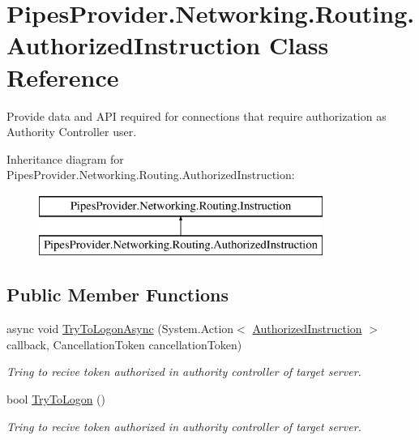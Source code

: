 \hypertarget{class_pipes_provider_1_1_networking_1_1_routing_1_1_authorized_instruction}{}\section{Pipes\+Provider.\+Networking.\+Routing.\+Authorized\+Instruction Class Reference}
\label{class_pipes_provider_1_1_networking_1_1_routing_1_1_authorized_instruction}


Provide data and A\+PI required for connections that require authorization as Authority Controller user.  


Inheritance diagram for Pipes\+Provider.\+Networking.\+Routing.\+Authorized\+Instruction\+:\begin{figure}[H]
\begin{center}
\leavevmode
\includegraphics[height=2.000000cm]{df/deb/class_pipes_provider_1_1_networking_1_1_routing_1_1_authorized_instruction}
\end{center}
\end{figure}
\subsection*{Public Member Functions}
\begin{DoxyCompactItemize}
\item 
async void \mbox{\hyperlink{class_pipes_provider_1_1_networking_1_1_routing_1_1_authorized_instruction_a20e94ddf386abb937f4c725a094dc050}{Try\+To\+Logon\+Async}} (System.\+Action$<$ \mbox{\hyperlink{class_pipes_provider_1_1_networking_1_1_routing_1_1_authorized_instruction}{Authorized\+Instruction}} $>$ callback, Cancellation\+Token cancellation\+Token)
\begin{DoxyCompactList}\small\item\em Tring to recive token authorized in authority controller of target server. \end{DoxyCompactList}\item 
bool \mbox{\hyperlink{class_pipes_provider_1_1_networking_1_1_routing_1_1_authorized_instruction_addf69c3fea172cc9d8199097466a052f}{Try\+To\+Logon}} ()
\begin{DoxyCompactList}\small\item\em Tring to recive token authorized in authority controller of target server. \end{DoxyCompactList}\end{DoxyCompactItemize}
